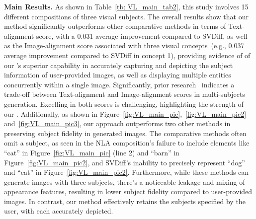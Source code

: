 \noindent\textbf{Main Results.} As shown in Table~\ref{tb: VL_main_tab2}, this study involves 15 different compositions of three visual subjects.
The overall results show that our method significantly outperforms other comparative methods in terms of Text-alignment score, with a 0.031 average improvement compared to SVDiff, as well as the Image-alignment score associated with three visual concepts~(e.g., 0.037 average improvement compared to SVDiff in concept 1), providing evidence of of our \our's superior capability in accurately capturing and depicting the subject information of user-provided images, as well as displaying multiple entities concurrently within a single image.
Significantly, prior research~\citep{kumari2023multi,gal2022image} indicates a trade-off between Text-alignment and Image-alignment scores in multi-subjects generation. Excelling in both scores is challenging, highlighting the strength of our \our{}.
Additionally, as shown in Figure~\ref{fig:VL_main_pic},~\ref{fig:VL_main_pic2} and~\ref{fig:VL_main_pic3}, our approach outperforms two other methods in preserving subject fidelity in generated images. The comparative methods often omit a subject, as seen in the NLA composition's failure to include elements like ``cat'' in Figure~\ref{fig:VL_main_pic} (line 2) and ``barn'' in Figure~\ref{fig:VL_main_pic2}, and SVDiff's inability to precisely represent ``dog'' and ``cat'' in Figure~\ref{fig:VL_main_pic2}. Furthermore, while these methods can generate images with three subjects, there's a noticeable leakage and mixing of appearance features, resulting in lower subject fidelity compared to user-provided images. In contrast, our method effectively retains the subjects specified by the user, with each accurately depicted.

